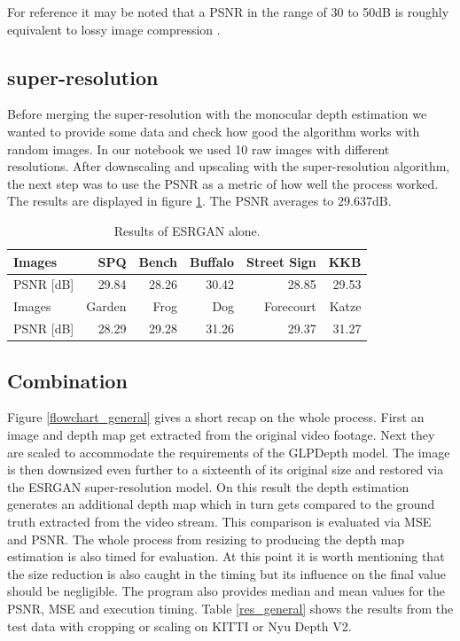 For reference it may be noted that a PSNR in the range of 30 to 50dB is roughly equivalent to lossy image compression \cite{psnr_ref}.

\subsection{super-resolution}

Before merging the super-resolution with the monocular depth estimation we wanted to provide some data and check how good the algorithm works with random images.
In our notebook we used 10 raw images with different resolutions. After downscaling and upscaling with the super-resolution algorithm, the next step was to use the PSNR as a metric of how well the process worked. The results are displayed in figure \ref*{res_esrgan}. The PSNR averages to $29.637\mathrm{dB}$.

\begin{table}[ht!]
    \begin{center}
        \begin{tabular}{ l | r r r r r }
            Images      & SPQ   & Bench & Buffalo   & Street Sign   & KKB   \\
            \hline
            PSNR [dB]   & 29.84 & 28.26 & 30.42     & 28.85         & 29.53 \\
            Images      & Garden    & Frog  & Dog   & Forecourt & Katze \\
            \hline
            PSNR [dB]   & 28.29     & 29.28 & 31.26 & 29.37     & 31.27 \\
        \end{tabular}
        \caption{Results of ESRGAN alone.} \label{res_esrgan}
    \end{center}
\end{table}


\subsection{Combination} \label{general_subsection}

Figure \ref*{flowchart_general} gives a short recap on the whole process. First an image and depth map get extracted from the original video footage. Next they are scaled to accommodate the requirements of the GLPDepth model. The image is then downsized even further to a sixteenth of its original size and restored via the ESRGAN super-resolution model. On this result the depth estimation generates an additional depth map which in turn gets compared to the ground truth extracted from the video stream. This comparison is evaluated via MSE and PSNR. The whole process from resizing to producing the depth map estimation is also timed for evaluation. At this point it is worth mentioning that the size reduction is also caught in the timing but its influence on the final value should be negligible. The program also provides median and mean values for the PSNR, MSE and execution timing.
Table \ref*{res_general} shows the results from the test data with cropping or scaling on KITTI or Nyu Depth V2.

